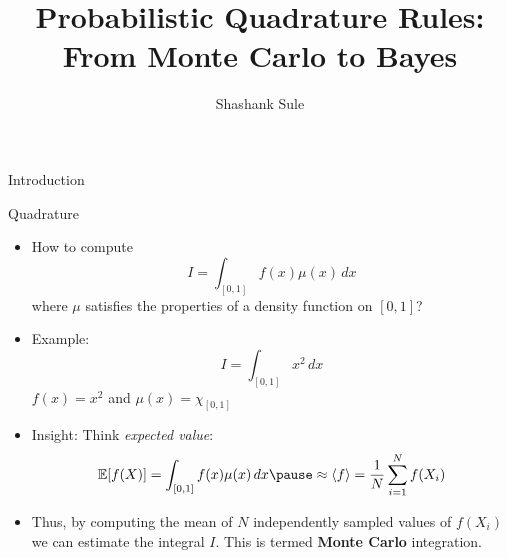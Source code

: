 \documentclass{beamer}
\title{Probabilistic Quadrature Rules: From Monte Carlo to Bayes}
\author{Shashank Sule}
\institute{Amherst College}%
\begin{document}
\begin{frame}
  \titlepage
\end{frame}

\begin{section}{Introduction}

\begin{frame}{Quadrature}
    \begin{itemize}
        \item How to compute
        $$ I = \int_{[0,1]}f(x)\mu(x)\,dx$$
        where $\mu$ satisfies the properties of a density function on $[0,1]$?
        \pause
        \item Example: 
        $$ I = \int_{[0,1]}x^2\,dx$$
        \pause
        $f(x) = x^2$ and $\mu(x) = \chi_{[0,1]}$
        \pause
        \item Insight: Think \textit{expected value}:
        \pause
        \begin{align}
            \mathbb{E}[f(X)] = \int_{[0,1]}f(x)\mu(x)\,dx \pause \approx \langle f \rangle = \frac{1}{N}\sum_{i=1}^{N}f(X_i)
        \end{align}
        \pause
        \item Thus, by computing the mean of $N$ independently sampled values of $f(X_i)$ we can estimate the integral $I$. This is termed \textbf{Monte Carlo} integration.
    \end{itemize}
\end{frame}
\end{section}
\end{document}
